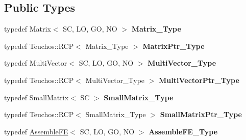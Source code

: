 \subsection*{Public Types}
\begin{DoxyCompactItemize}
\item 
\mbox{\label{classFEDD_1_1AssembleFE_a45f9f1ceeab511de82617cdbf61f58b2}} 
typedef Matrix$<$ SC, LO, GO, NO $>$ {\bfseries Matrix\+\_\+\+Type}
\item 
\mbox{\label{classFEDD_1_1AssembleFE_a2c09e302d672917051e08717a0bc3b57}} 
typedef Teuchos\+::\+R\+CP$<$ Matrix\+\_\+\+Type $>$ {\bfseries Matrix\+Ptr\+\_\+\+Type}
\item 
\mbox{\label{classFEDD_1_1AssembleFE_a57a5fcd67809d34fb20a7d4bf8fa31b0}} 
typedef Multi\+Vector$<$ SC, LO, GO, NO $>$ {\bfseries Multi\+Vector\+\_\+\+Type}
\item 
\mbox{\label{classFEDD_1_1AssembleFE_af26f84acc76b7f712002cb67bb1b4869}} 
typedef Teuchos\+::\+R\+CP$<$ Multi\+Vector\+\_\+\+Type $>$ {\bfseries Multi\+Vector\+Ptr\+\_\+\+Type}
\item 
\mbox{\label{classFEDD_1_1AssembleFE_a8b8c588ba0cfaa200a74215f19e62722}} 
typedef Small\+Matrix$<$ SC $>$ {\bfseries Small\+Matrix\+\_\+\+Type}
\item 
\mbox{\label{classFEDD_1_1AssembleFE_afb5fb5dca3aab59f697a25884e99e894}} 
typedef Teuchos\+::\+R\+CP$<$ Small\+Matrix\+\_\+\+Type $>$ {\bfseries Small\+Matrix\+Ptr\+\_\+\+Type}
\item 
\mbox{\label{classFEDD_1_1AssembleFE_ab2c8bb1fd65dfcf7899a7c4a4a8a4021}} 
typedef \hyperlink{classFEDD_1_1AssembleFE}{Assemble\+FE}$<$ SC, LO, GO, NO $>$ {\bfseries Assemble\+F\+E\+\_\+\+Type}
\end{DoxyCompactItemize}
